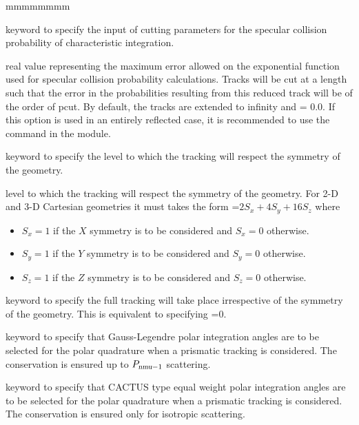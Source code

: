 \begin{ListeDeDescription}{mmmmmmmm}
\item[\moc{CUT}] keyword to specify the input of cutting parameters for the specular collision probability
of characteristic integration. 

\item[\dusa{pcut}] real value representing the maximum error allowed on the exponential function used
for specular collision probability calculations. Tracks will be cut at a length such that the error in the 
probabilities resulting from this reduced track will be of the order of pcut. By default, the tracks 
are extended to infinity and  = 0.0. If this option is used in an entirely reflected case, it is 
recommended to use the  command in the  module. 

\item[\moc{SYMM}] keyword to specify the level to which the tracking will respect the symmetry of the geometry. 

\item[\dusa{isymm}]  level to which the tracking will respect the symmetry of the geometry. For 2-D and 3-D Cartesian geometries it must takes the form =$2 S_{x}+4S_{y}+16 S_{z}$ where
\begin{itemize}
\item $S_{x}=1$ if the $X$ symmetry is to be considered and $S_{x}=0$ otherwise.   
\item $S_{y}=1$ if the $Y$ symmetry is to be considered and $S_{y}=0$ otherwise.   
\item $S_{z}=1$ if the $Z$ symmetry is to be considered and $S_{z}=0$ otherwise.   
\end{itemize}

\item[\moc{NOSY}] keyword to specify the full tracking will take place irrespective of the symmetry of the geometry. This is equivalent to specifying =0.

\item[\moc{GAUS}] keyword to specify that Gauss-Legendre polar integration angles are to be selected for the polar quadrature when a prismatic tracking is considered. The conservation is ensured up to $P_{\dusa{nmu}-1}$ scattering.

\item[\moc{CACA}] keyword to specify that CACTUS type equal weight polar integration angles are to be
selected for the polar quadrature when a prismatic tracking is considered.\cite{CACTUS} The conservation is ensured only for isotropic scattering.


\end{ListeDeDescription}
